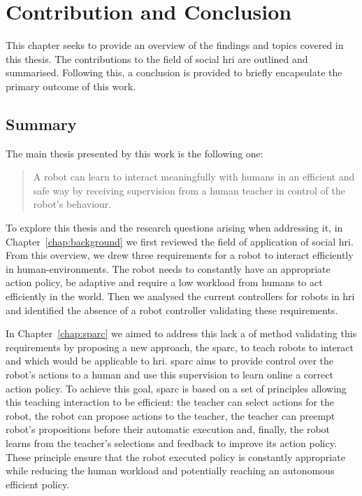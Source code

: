 \chapter{Contribution and Conclusion} \label{chap:conclusion}
\glsresetall
This chapter seeks to provide an overview of the findings and topics covered in this thesis. The contributions to the field of social \gls{hri} are outlined and summarised. Following this, a conclusion is provided to briefly encapsulate the primary outcome of this work.

\section{Summary}\label{sec:conc_summary}

The main thesis presented by this work is the following one: 
\begin{quote}
	A robot can learn to interact meaningfully with humans in an efficient and safe way by receiving supervision from a human teacher in control of the robot's behaviour. 
\end{quote}

To explore this thesis and the research questions arising when addressing it, in Chapter~\ref{chap:background} we first reviewed the field of application of social \gls{hri}. From this overview, we drew three requirements for a robot to interact efficiently in human-environments. The robot needs to constantly have an appropriate action policy, be adaptive and require a low workload from humans to act efficiently in the world. Then we analysed the current controllers for robots in \gls{hri} and identified the absence of a robot controller validating these requirements.

In Chapter~\ref{chap:sparc} we aimed to address this lack a of method validating this requirements by proposing a new approach, the \gls{sparc}, to teach robots to interact and which would be applicable to \gls{hri}. \gls{sparc} aims to provide control over the robot's actions to a human and use this supervision to learn online a correct action policy. To achieve this goal, \gls{sparc} is based on a set of principles allowing this teaching interaction to be efficient: the teacher can select actions for the robot, the robot can propose actions to the teacher, the teacher can preempt robot's propositions before their automatic execution and, finally, the robot learns from the teacher's selections and feedback to improve its action policy. These principle ensure that the robot executed policy is constantly appropriate while reducing the human workload and potentially reaching an autonomous efficient policy.

